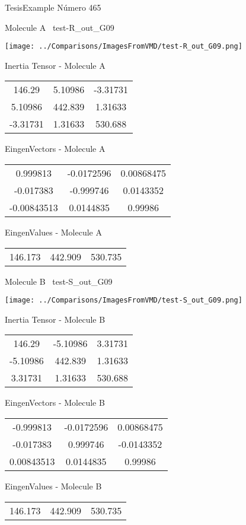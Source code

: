 \vtab[-3cm]
\begin{center}
{\large TesisExample \tab Número 465}
\end{center}
\begin{multicols}{2}
\begin{center}

Molecule A \
test-R\_out\_G09

\texttt{[image: ../Comparisons/ImagesFromVMD/test-R\_out\_G09.png]}

Inertia Tensor - Molecule A \\
\begin{tabular}{|c c c|}
146.29	 & 	5.10986	 & 	-3.31731	 \\
5.10986	 & 	442.839	 & 	1.31633	 \\
-3.31731	 & 	1.31633	 & 	530.688
\end{tabular}

\vtab
 EingenVectors - Molecule A     \\
\begin{tabular}{|c c c|}
0.999813	 & 	-0.0172596	 & 	0.00868475	 \\
-0.017383	 & 	-0.999746	 & 	0.0143352	 \\
-0.00843513	 & 	0.0144835	 & 	0.99986
\end{tabular}

\vtab
 EingenValues - Molecule A     \\
\begin{tabular}{|c c c|}
146.173	 & 	442.909	 & 	530.735	 \\
\end{tabular}
\columnbreak

Molecule B \
test-S\_out\_G09

\texttt{[image: ../Comparisons/ImagesFromVMD/test-S\_out\_G09.png]}

Inertia Tensor - Molecule B \\
\begin{tabular}{|c c c|}
146.29	 & 	-5.10986	 & 	3.31731	 \\
-5.10986	 & 	442.839	 & 	1.31633	 \\
3.31731	 & 	1.31633	 & 	530.688
\end{tabular}

\vtab
 EingenVectors - Molecule B     \\
\begin{tabular}{|c c c|}
-0.999813	 & 	-0.0172596	 & 	0.00868475	 \\
-0.017383	 & 	0.999746	 & 	-0.0143352	 \\
0.00843513	 & 	0.0144835	 & 	0.99986
\end{tabular}

\vtab
 EingenValues - Molecule B     \\
\begin{tabular}{|c c c|}
146.173	 & 	442.909	 & 	530.735	 \\
\end{tabular}

\end{center}
\end{multicols}

